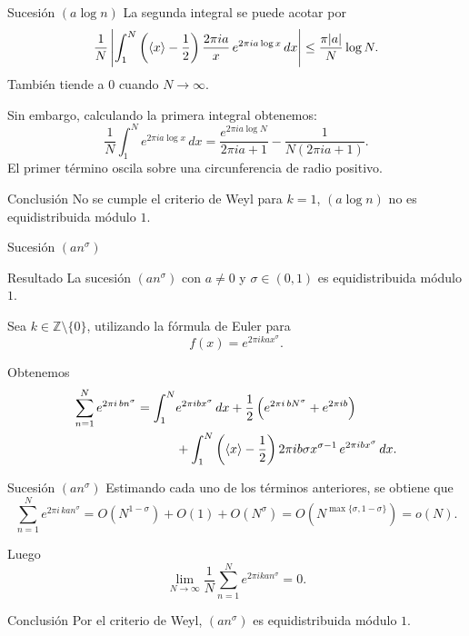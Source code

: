 \begin{frame}{Sucesión $(a\log n)$}
La segunda integral se puede acotar por
\[
\frac{1}{N}\left|\int_1^N \left(\langle x \rangle - \frac{1}{2}\right) \dfrac{2\pi i a}{x} \, e^{2\pi i a \log x} \, dx\right|
\leq \frac{\pi |a|}{N} \log N.
\]
También tiende a \(0\) cuando \(N \to \infty\).

\pause

Sin embargo, calculando la primera integral obtenemos:
\[
\frac{1}{N}\int_1^N e^{2\pi i a \log x} \, dx = \frac{e^{2\pi i a \log N}}{2\pi i a + 1} - \frac{1}{N(2\pi i a + 1)}.
\]
El primer término oscila sobre una circunferencia de radio positivo.

\pause

\begin{alertblock}{Conclusión}
No se cumple el criterio de Weyl para $k=1$, $(a\log n)$ no es equidistribuida módulo $1$.
\end{alertblock}
\end{frame}


\begin{frame}{Sucesión $(an^\sigma)$}

\begin{block}{Resultado}
La sucesión $(an^\sigma)$ con $a\neq 0$ y $\sigma\in(0,1)$ es equidistribuida módulo $1$.
\end{block}

\vspace{0.2cm}
\pause

Sea $k\in\mathbb{Z}\setminus\{0\}$, utilizando la fórmula de Euler para 
\[
f(x)=e^{2\pi i k a x^\sigma}.
\]

\pause 

Obtenemos
\begin{align*}
\sum_{n=1}^N e^{2\pi i \, b n^\sigma}
= \int_1^N &e^{2\pi i b x^\sigma} \, dx 
+ \frac{1}{2} \left(e^{2\pi i \, b N^\sigma} + e^{2\pi i b}\right) \\
&+ \int_1^N \left(\langle x \rangle - \frac{1}{2}\right) 2\pi i b \sigma x^{\sigma-1} \, e^{2\pi i b x^\sigma} \, dx .
\end{align*}

\end{frame}

\begin{frame}{Sucesión $(an^\sigma)$}
Estimando cada uno de los términos anteriores, se obtiene que
\[
\sum_{n=1}^N e^{2\pi i \, ka n^\sigma} = O(N^{1-\sigma}) + O(1) + O(N^\sigma) = O(N^{\max\{\sigma, 1-\sigma\}}) = o(N).
\]

\pause

Luego
\[
\lim_{N \to \infty} \frac{1}{N} \sum_{n=1}^N e^{2\pi i k a n^\sigma} = 0.
\]

\begin{exampleblock}{Conclusión}
Por el criterio de Weyl, $(an^\sigma)$ es equidistribuida módulo $1$.
\end{exampleblock}
\end{frame}

